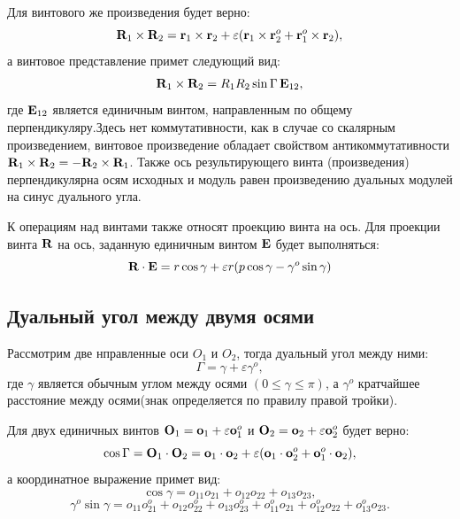 Для винтового же произведения будет верно:
\begin{equation*}
    \vb{R}_1 \times \vb{R}_2 = \vb{r}_1 \times \vb{r}_2 + \varepsilon (\vb{r}_1 \times \vb{r}_2^o + \vb{r}_1^o \times \vb{r}_2),
\end{equation*}
а винтовое представление примет следующий вид:
\begin{equation*}
    \vb{R}_1 \times \vb{R}_2 = R_1 R_2 \sin \Gamma \, \vb{E}_{12},
\end{equation*}
где $\vb{E}_{12}$ является единичным винтом, направленным по общему перпендикуляру.Здесь нет коммутативности, как в случае со скалярным произведением, винтовое произведение обладает свойством антикоммутативности $\vb{R}_1 \times \vb{R}_2 = -\vb{R}_2 \times \vb{R}_1$. Также ось результирующего винта (произведения) перпендикулярна осям исходных и модуль равен произведению дуальных модулей на синус дуального угла.

К операциям над винтами также относят проекцию винта на ось. Для проекции винта $\vb{R}$ на ось, заданную единичным винтом $\vb{E}$ будет выполняться:
\begin{equation*}
    \vb{R} \cdot \vb{E} = r \cos \gamma + \varepsilon r (p \cos \gamma - \gamma^o \sin \gamma)
\end{equation*}

\subsection{Дуальный угол между двумя осями}

Рассмотрим две нправленные оси $O_1$ и $O_2$, тогда дуальный угол между ними:
\begin{equation*}
    \Gamma = \gamma + \varepsilon \gamma^o,
\end{equation*}
где $\gamma$ является обычным углом между осями $(0 \leq \gamma \leq \pi)$, а $\gamma^o$ кратчайшее расстояние между осями(знак определяется по правилу правой тройки).

Для двух единичных винтов $\vb{O}_1 = \vb{o}_1 + \varepsilon \vb{o}_1^o$ и $\vb{O}_2 = \vb{o}_2 + \varepsilon \vb{o}_2^o$ будет верно:
\begin{equation*}
    \cos \Gamma = \vb{O}_1 \cdot \vb{O}_2 = \vb{o}_1 \cdot \vb{o}_2 + \varepsilon (\vb{o}_1 \cdot \vb{o}_2^o + \vb{o}_1^o \cdot \vb{o}_2),
\end{equation*}
а координатное выражение примет вид:
\begin{equation*}
    \cos \gamma = o_{11} o_{21} + o_{12} o_{22} + o_{13} o_{23},
\end{equation*}
\begin{equation*}
    \gamma^o \sin \gamma = o_{11} o_{21}^o + o_{12} o_{22}^o + o_{13} o_{23}^o + o_{11}^o o_{21} + o_{12}^o o_{22} + o_{13}^o o_{23}.
\end{equation*}

